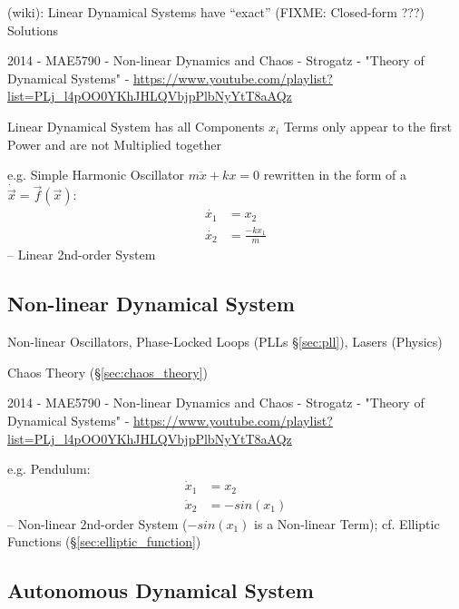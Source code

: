 (wiki): Linear Dynamical Systems have ``exact'' (FIXME: Closed-form ???)
Solutions

\asterism

2014 - MAE5790 - Non-linear Dynamics and Chaos - Strogatz - "Theory of
Dynamical Systems" -
\url{https://www.youtube.com/playlist?list=PLj_l4pOO0YKhJHLQVbjpPlbNyYtT8aAQz}

Linear Dynamical System has all Components $x_i$ Terms only appear to the first
Power and are not Multiplied together

e.g. Simple Harmonic Oscillator $m\ddot{x} + kx = 0$
rewritten in the form of a $\dot{\vec{x}} = \vec{f}(\vec{x})$:
\begin{align*}
  \dot{x_1} & = x_2 \\
  \dot{x_2} & = \frac{-kx_1}{m}
\end{align*}
-- Linear 2nd-order System



\subsection{Non-linear Dynamical System}\label{sec:nonlinear_dynamical_system}

Non-linear Oscillators, Phase-Locked Loops (PLLs \S\ref{sec:pll}), Lasers
(Physics)

\fist Chaos Theory (\S\ref{sec:chaos_theory})

2014 - MAE5790 - Non-linear Dynamics and Chaos - Strogatz - "Theory of
Dynamical Systems" -
\url{https://www.youtube.com/playlist?list=PLj_l4pOO0YKhJHLQVbjpPlbNyYtT8aAQz}

e.g. Pendulum:
\begin{align*}
  \dot{x}_1 & = x_2 \\
  \dot{x}_2 & = -sin(x_1)
\end{align*}
-- Non-linear 2nd-order System ($-sin(x_1)$ is a Non-linear Term); cf. Elliptic
Functions
(\S\ref{sec:elliptic_function})



\subsection{Autonomous Dynamical System}\label{sec:autonomous_dynamical_system}

